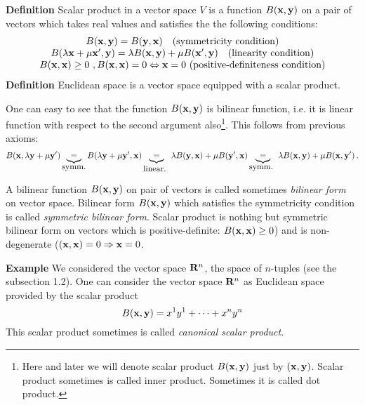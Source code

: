 \documentclass[12pt]{article}
\numberwithin{equation}{section}
\begin{document}
{\bf Definition} Scalar product in a vector space $V$ is  a function $B({\bf x},{\bf y})$ on a pair of
 vectors which takes real values and satisfies the  the following conditions:
               \begin{equation}\label{scalarproductproperties}
              \begin{array}  {cc}
                B({\bf x},{\bf y})=B({\bf y},{\bf x}) \quad \hbox  {(symmetricity condition)}\\
                   B(\lambda{\bf x}+\mu{\bf x}',{\bf y})=
                   \lambda B({\bf x},{\bf y})+\mu B({\bf x}',{\bf y})\quad   \hbox  {(linearity condition)}\\
                 B( {\bf x},{\bf x})\geq 0\,\, , B({\bf x},{\bf x})= 0\Leftrightarrow  {\bf x}=0\,\,
                 \hbox{(positive-definiteness condition)}
                   \end{array}
               \end{equation}
{\bf Definition } Euclidean space is a vector space equipped with a scalar product.

\m


  One can easy to see that the function $B({\bf x},{\bf y})$ is bilinear function, i.e.
  it is linear function with respect to the second argument also\footnote{Here and later we will denote scalar
   product $B({\bf x},{\bf y})$ just by $({\bf x},{\bf y})$. Scalar product sometimes is called inner product. Sometimes it is called
    dot product.}.
  This follows from previous axioms:
                   $$
   B({\bf x},\lambda{\bf y}+\mu{\bf y}')\underbrace{=}_{\hbox {symm.}}B(\lambda{\bf y}+\mu{\bf y}',{\bf x})
   \underbrace{=}_{\hbox {linear. }}\lambda B({\bf y},{\bf x})+\mu B({\bf y}',{\bf x})
   \underbrace{=}_{\hbox {symm. }}\lambda B({\bf x},{\bf y})+\mu B({\bf x},{\bf y}')\,.
                   $$

{\footnotesize A bilinear function  $B({\bf x},{\bf y})$ on pair of vectors is called sometimes {\it bilinear form} on
vector space. Bilinear form $B({\bf x},{\bf y})$  which satisfies the symmetricity condition is called
{\it symmetric bilinear form}.  Scalar product is nothing but symmetric bilinear form on vectors
which is positive-definite: $B({\bf x},{\bf x})\geq 0$) and is non-degenerate ($({\bf x},{\bf x})= 0\Rightarrow  {\bf x}=0$}.

\medskip



\medskip


{\bf Example} We considered the vector space ${\bf R}^n$, the space of $n$-tuples (see the subsection 1.2).
 One can consider the vector space ${\bf R}^n$ as Euclidean space provided by the scalar product
         \begin{equation}\label{scalarproductexample1}
                    B({\bf x},{\bf y})=x^1y^1+\dots+x^ny^n
                \end{equation}
This scalar product sometimes is called {\it canonical scalar product}.
\end{document}
